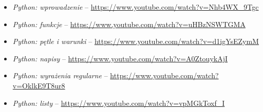 % 
% 
% 
% 

\begin{itemize}
\item \emph{Python: wprowadzenie} – \url{https://www.youtube.com/watch?v=Nhb4WX_9Tgc}
\item \emph{Python: funkcje} – \url{https://www.youtube.com/watch?v=uHBzNSWTGMA}
\item \emph{Python: pętle i warunki} – \url{https://www.youtube.com/watch?v=d1igYsEZymM}
\item \emph{Python: napisy} – \url{https://www.youtube.com/watch?v=A0ZtouykAjI}
\item \emph{Python: wyrażenia regularne} – \url{https://www.youtube.com/watch?v=OklkE9T8ur8}
\item \emph{Python: listy} – \url{https://www.youtube.com/watch?v=vpMGkToxf_I}
\end{itemize}
